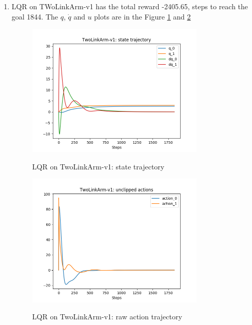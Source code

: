 \documentclass[12pt]{article}
\begin{document}
\begin{tcolorbox}
\begin{enumerate}
	Under the TwoLinkArm-limited-torque-v0 environment where the torque is limited to 10 and -10, the LQR controller needs much longer time to make the arms reach the goal state. However, because the torque is limited, the $\dot{q}$ is always small, as shown in Figure \ref{fig:lqr_states_2}. Compared to the TwoLineArm-v0, there are obvious oscillations for the $q$ before it converges to the goal, as shown in the Figure \ref{fig:lqr_states_2}. 
	
	\item
	LQR on TWoLinkArm-v1 has the total reward -2405.65, steps to reach the goal 1844. The $q$, $\dot{q}$ and $u$ plots are in the Figure \ref{fig:lqr_states_4} and \ref{fig:lqr_actions_4}
	
	\begin{figure}[H]
	\caption{LQR on TwoLinkArm-v1: state trajectory}	
	\centering
	\includegraphics[width=0.8\textwidth]{lqr_4_states.png}
	\label{fig:lqr_states_4}
	\end{figure}
	
	\begin{figure}[H]
	\caption{LQR on TwoLinkArm-v1: raw action trajectory}
	\centering
	\includegraphics[width=0.8\textwidth]{lqr_4_raw_acts.png}
	\label{fig:lqr_actions_4}	
	\end{figure}
	

\end{enumerate}
\end{tcolorbox}
\end{document}

